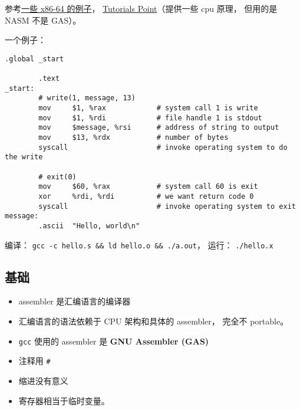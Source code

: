 
\begin{issues}
\issueDraft
\end{issues}

参考\href{https://cs.lmu.edu/~ray/notes/gasexamples/}{一些 x86-64 的例子}， \href{https://www.tutorialspoint.com/assembly_programming/index.htm}{Tutorials Point}（提供一些 cpu 原理， 但用的是 NASM 不是 GAS）。

一个例子：
\begin{lstlisting}[language=none]
        .global _start

        .text
_start:
        # write(1, message, 13)
        mov     $1, %rax            # system call 1 is write
        mov     $1, %rdi            # file handle 1 is stdout
        mov     $message, %rsi      # address of string to output
        mov     $13, %rdx           # number of bytes
        syscall                     # invoke operating system to do the write

        # exit(0)
        mov     $60, %rax           # system call 60 is exit
        xor     %rdi, %rdi          # we want return code 0
        syscall                     # invoke operating system to exit
message:
        .ascii  "Hello, world\n"
\end{lstlisting}

编译： \verb|gcc -c hello.s && ld hello.o && ./a.out|， 运行： \verb|./hello.x|

\subsection{基础}
\begin{itemize}
\item assembler 是汇编语言的编译器
\item 汇编语言的语法依赖于 CPU 架构和具体的 assembler， 完全不 portable。
\item \verb|gcc| 使用的 assembler 是 \textbf{GNU Assembler (GAS)}
\item 注释用 \verb|#|
\item 缩进没有意义
\item 寄存器相当于临时变量。
\end{itemize}

